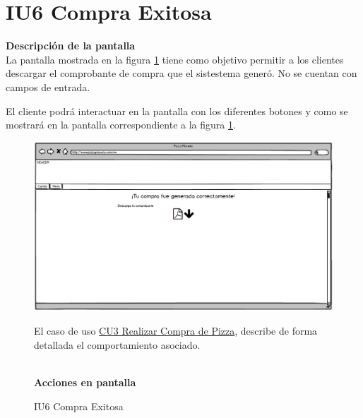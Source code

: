 \hypertarget{IU6}{}
\section{IU6 Compra Exitosa}

\noindent \textbf{Descripción de la pantalla}\\

La pantalla mostrada en la figura \ref{IU6} tiene como objetivo permitir a los clientes descargar el comprobante de compra que el sistestema generó.
No se cuentan con campos de entrada.

El cliente podrá interactuar en la pantalla con los diferentes botones y  como se mostrará en la pantalla correspondiente a la figura \ref{IU6}.

\begin{figure}[h]
	
	\begin{center}				
		
		\includegraphics[scale=0.50]{./imagenes/IUs/RegistroSolicitantes/iu1-IniciarSesion/IU6-CompraExitosa.png}
		\caption{IU6 Compra Exitosa}
		\label{IU6}
		
	\end{center}
	
	El caso de uso \hyperlink{CU3}{CU3 Realizar Compra de Pizza}, describe de forma detallada el comportamiento asociado.
	
	\noindent \textbf{\\Acciones en pantalla}
	
	\begin{itemize}
		

\end{itemize}
\end{figure}
